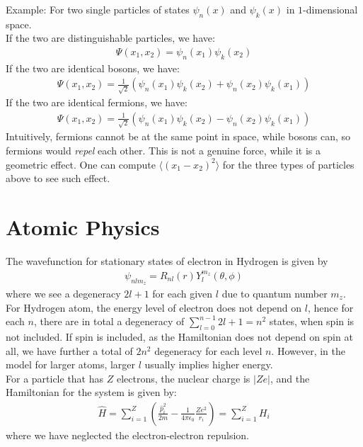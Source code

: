 \documentclass[11pt]{book}
\theoremstyle{break}
\theoremstyle{break}
\newcommand{\example}{\color{green}Example: \color{black}}
\begin{document}
\example For two single particles of states $\psi_n(x)$ and $\psi_k(x)$ in $1$-dimensional space.\\
If the two are distinguishable particles, we have:
\begin{align*}
\Psi(x_1,x_2) = \psi_n(x_1) \psi_k(x_2)
\end{align*}
If the two are identical bosons, we have:
\begin{align*}
\Psi(x_1,x_2) = \frac{1}{\sqrt{2}}\left(\psi_n(x_1) \psi_k(x_2) + \psi_n(x_2) \psi_k(x_1) \right)
\end{align*}
If the two are identical fermions, we have:
\begin{align*}
\Psi(x_1,x_2) = \frac{1}{\sqrt{2}}\left(\psi_n(x_1) \psi_k(x_2) - \psi_n(x_2) \psi_k(x_1) \right)
\end{align*}
Intuitively, fermions cannot be at the same point in space, while bosons can, so fermions would \textit{repel} each other. This is not a genuine force, while it is a geometric effect. One can compute $\langle (x_1 - x_2)^2 \rangle$ for the three types of particles above to see such effect. 

\newpage
\section[Atomic Physics]{\color{red} Atomic Physics\color{black}}
The wavefunction for stationary states of electron in Hydrogen is given by 
\begin{align*}
\psi_{nlm_z} = R_{nl}(r)Y_l^{m_z}(\theta,\phi)
\end{align*}
where we see a degeneracy $2l+1$ for each given $l$ due to quantum number $m_z$. For Hydrogen atom, the energy level of electron does not depend on $l$, hence for each $n$, there are in total a degeneracy of $\sum_{l=0}^{n-1}2l+1 = n^2$ states, when spin is not included. If spin is included, as the Hamiltonian does not depend on spin at all, we have further a total of $2n^2$ degeneracy for each level $n$. However, in the model for larger atoms, larger $l$ usually implies higher energy. \\

For a particle that has $Z$ electrons, the nuclear charge is $|Ze|$, and the Hamiltonian for the system is given by:
\begin{align*}
\hat{H} = \sum_{i=1}^Z\left( \frac{\hat{p}_i^2}{2m} - \frac{1}{4\pi \epsilon_0}\frac{Ze^2}{r_i}\right) = \sum_{i=1}^{Z} H_i
\end{align*}
where we have neglected the electron-electron repulsion.\\
\end{document}
